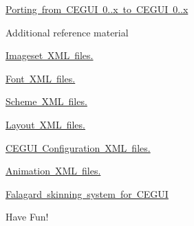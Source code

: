 \begin{DoxyItemize}
\begin{DoxyItemize}
\item \mbox{\hyperlink{porting6to7}{Porting from C\+E\+G\+UI 0..\+x to C\+E\+G\+UI 0..\+x}}
\end{DoxyItemize}
\item Additional reference material
\begin{DoxyItemize}
\item \mbox{\hyperlink{xml_imageset}{Imageset X\+ML files.}}
\item \mbox{\hyperlink{xml_font}{Font X\+ML files.}}
\item \mbox{\hyperlink{xml_scheme}{Scheme X\+ML files.}}
\item \mbox{\hyperlink{xml_layout}{Layout X\+ML files.}}
\item \mbox{\hyperlink{xml_config}{C\+E\+G\+UI Configuration X\+ML files.}}
\item \mbox{\hyperlink{xml_animation}{Animation X\+ML files.}}
\item \mbox{\hyperlink{fal_man}{Falagard skinning system for C\+E\+G\+UI}}
\end{DoxyItemize}
\end{DoxyItemize}

Have Fun! 